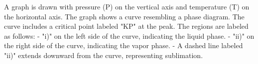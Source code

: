 A graph is drawn with pressure (P) on the vertical axis and temperature (T) on the horizontal axis. The graph shows a curve resembling a phase diagram. The curve includes a critical point labeled "KP" at the peak. The regions are labeled as follows:  
- "i)" on the left side of the curve, indicating the liquid phase.  
- "ii)" on the right side of the curve, indicating the vapor phase.  
- A dashed line labeled "ii)" extends downward from the curve, representing sublimation.